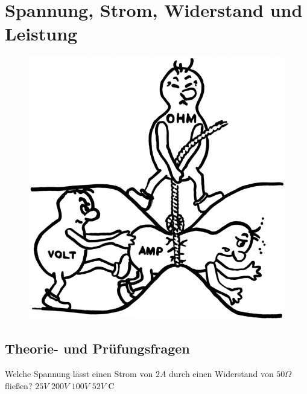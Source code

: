 \graphicspath{{./SSW/}}

\chapter{Spannung, Strom, Widerstand und Leistung}

\begin{figure}
 \vspace{-7cm}
  \includegraphics[scale=0.15]{URI.png}
 \vspace{-6cm}
\end{figure}

\section*{Theorie- und Prüfungsfragen}





{Welche Spannung lässt einen Strom von $2A$ durch einen Widerstand von $50\Omega$ fließen?}%
{$25V$}%
{$200V$}%
{$100V$}%
{$52V$}%
{C}%

